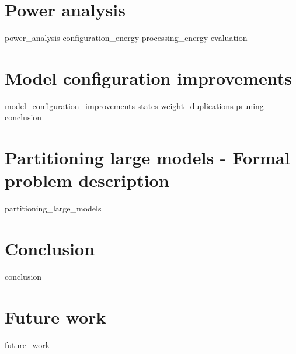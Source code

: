 \documentclass[a4paper,12pt]{report}
\begin{document}
\chapter{Power analysis} \label{chapter:power_analysis}
{power_analysis}
{configuration_energy}
{processing_energy}
{evaluation}

\chapter{Model configuration improvements} \label{chapter:model_configuration_improvements}
{model_configuration_improvements}
{states}
{weight_duplications}
{pruning}
{conclusion}

\chapter{Partitioning large models - Formal problem description}
{partitioning_large_models}

\chapter{Conclusion}
{conclusion}

\chapter{Future work}
{future_work}

\newpage
\printbibliography[heading=bibintoc]
\end{document}
